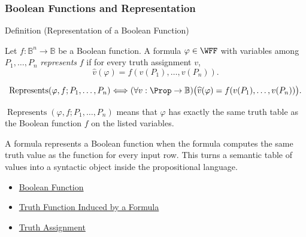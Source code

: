 \subsubsection*{Boolean Functions and Representation}

\begin{definitionbox}{Definition (Representation of a Boolean Function)}
\begin{definition}
\label{def:boolean-function-representation-propositional-logic}
Let \(f:\mathbb{B}^n\to\mathbb{B}\) be a Boolean function. A formula
\(\varphi\in\WFF\) with variables among \(P_1,\ldots,P_n\) \emph{represents}
\(f\) if for every truth assignment \(v\),
\[
\widehat v(\varphi)=f(v(P_1),\ldots,v(P_n)).
\]
\end{definition}
\end{definitionbox}

\begin{remark*}
\[
\operatorname{Represents}(\varphi,f;P_1,\ldots,P_n)
\Longleftrightarrow
(\forall v:\Prop\to\mathbb{B})
\bigl(\widehat v(\varphi)=f(v(P_1),\ldots,v(P_n))\bigr).
\]
\end{remark*}

\begin{remark*}
\(\operatorname{Represents}(\varphi,f;P_1,\ldots,P_n)\) means that
\(\varphi\) has exactly the same truth table as the Boolean function \(f\) on
the listed variables.
\end{remark*}

\begin{remark*}[Interpretation]
A formula represents a Boolean function when the formula computes the same
truth value as the function for every input row. This turns a semantic table of
values into a syntactic object inside the propositional language.
\end{remark*}

\begin{dependencies}
\begin{itemize}
  \item \hyperref[def:boolean-function-propositional-logic]{Boolean Function}
  \item \hyperref[def:truth-function-induced-by-formula]{Truth Function Induced by a Formula}
  \item \hyperref[def:truth-assignment-propositional-logic]{Truth Assignment}
\end{itemize}
\end{dependencies}

